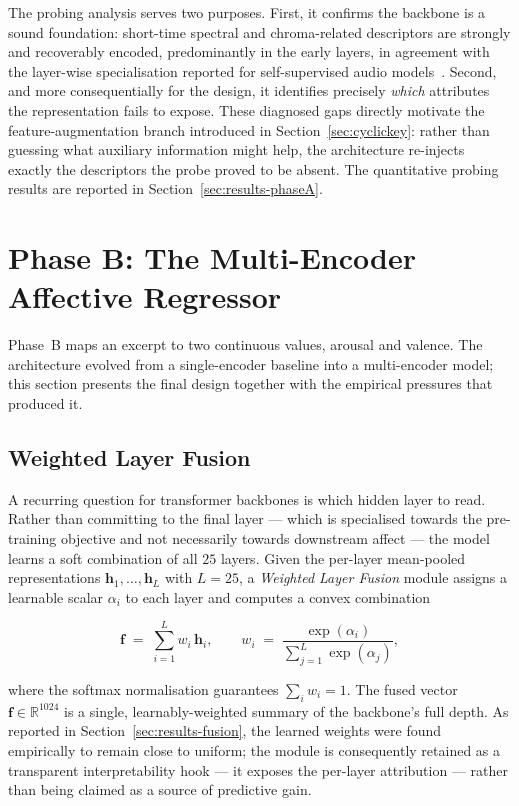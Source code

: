\documentclass[12pt]{report}
\begin{document}
The probing analysis serves two purposes. First, it confirms the backbone is a sound foundation: short-time spectral and chroma-related descriptors are strongly and recoverably encoded, predominantly in the early layers, in agreement with the layer-wise specialisation reported for self-supervised audio models~\cite{ma_effectiveness_2023}. Second, and more consequentially for the design, it identifies precisely \emph{which} attributes the representation fails to expose. These diagnosed gaps directly motivate the feature-augmentation branch introduced in Section~\ref{sec:cyclickey}: rather than guessing what auxiliary information might help, the architecture re-injects exactly the descriptors the probe proved to be absent. The quantitative probing results are reported in Section~\ref{sec:results-phaseA}.

\section{Phase B: The Multi-Encoder Affective Regressor}
\label{sec:phaseB}

Phase~B maps an excerpt to two continuous values, arousal and valence. The architecture evolved from a single-encoder baseline into a multi-encoder model; this section presents the final design together with the empirical pressures that produced it.

\subsection{Weighted Layer Fusion}
\label{sec:fusion}

A recurring question for transformer backbones is which hidden layer to read. Rather than committing to the final layer --- which is specialised towards the pre-training objective and not necessarily towards downstream affect --- the model learns a soft combination of all $25$ layers. Given the per-layer mean-pooled representations $\mathbf{h}_{1},\dots,\mathbf{h}_{L}$ with $L=25$, a \emph{Weighted Layer Fusion} module assigns a learnable scalar $\alpha_{i}$ to each layer and computes a convex combination

\begin{equation}
\label{eq:fusion}
\mathbf{f} \;=\; \sum_{i=1}^{L} w_{i}\,\mathbf{h}_{i},
\qquad
w_{i} \;=\; \frac{\exp(\alpha_{i})}{\sum_{j=1}^{L}\exp(\alpha_{j})},
\end{equation}

where the softmax normalisation guarantees $\sum_{i} w_{i}=1$. The fused vector $\mathbf{f}\in\mathbb{R}^{1024}$ is a single, learnably-weighted summary of the backbone's full depth. As reported in Section~\ref{sec:results-fusion}, the learned weights were found empirically to remain close to uniform; the module is consequently retained as a transparent interpretability hook --- it exposes the per-layer attribution --- rather than being claimed as a source of predictive gain.
\end{document}
